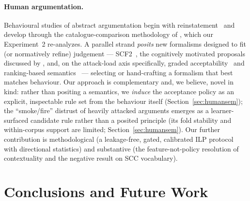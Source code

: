 \documentclass[review,12pt]{elsarticle}
\theoremstyle{definition}
\theoremstyle{remark}
\begin{document}
\paragraph{Human argumentation.} Behavioural studies of abstract argumentation
begin with reinstatement~\citep{rahwan2010} and develop through the
catalogue-comparison methodology of \citet{cramer2018,guillaume2022}, which our
Experiment~2 re-analyzes. A parallel strand \emph{posits} new formalisms
designed to fit (or normatively refine) judgement --- SCF2~\citep{cramer2019scf2},
the cognitively motivated proposals discussed by \citet{cramer2023cognitive},
and, on the attack-load axis specifically, graded
acceptability~\citep{grossi2019graded} and ranking-based
semantics~\citep{amgoud2013ranking,bonzon2016ranking} --- selecting or
hand-crafting a formalism that best matches behaviour. Our approach is
complementary and, we believe, novel in kind: rather than positing a semantics,
we \emph{induce} the acceptance policy as an explicit, inspectable rule set from
the behaviour itself (Section~\ref{sec:humansem}); the ``smoke/fire'' distrust of
heavily attacked arguments emerges as a learner-surfaced candidate rule
rather than a posited principle (its fold stability and within-corpus support
are limited; Section~\ref{sec:humansem}). Our further contribution is methodological (a leakage-free, gated,
calibrated ILP protocol with directional statistics) and substantive (the
feature-not-policy resolution of contextuality and the negative result on SCC
vocabulary).

\section{Conclusions and Future Work}
\label{sec:concl}
\end{document}
